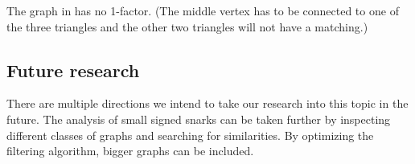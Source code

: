 The graph in  has no 1-factor. (The middle vertex has to be connected to one of the three triangles and the other two triangles will not have a matching.)

\subsection{Future research}

There are multiple directions we intend to take our research into this topic in the future. The analysis of small signed snarks can be taken further by inspecting different classes of graphs and searching for similarities. By optimizing the filtering algorithm, bigger graphs can be included.
